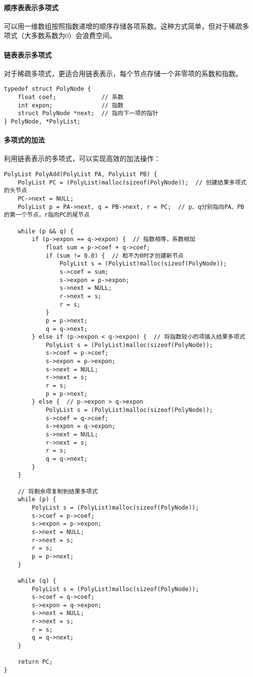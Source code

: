 \documentclass{../../note}
\begin{document}
\paragraph{顺序表表示多项式}
可以用一维数组按照指数递增的顺序存储各项系数。这种方式简单，但对于稀疏多项式（大多数系数为0）会浪费空间。

\paragraph{链表表示多项式}
对于稀疏多项式，更适合用链表表示，每个节点存储一个非零项的系数和指数。

\begin{verbatim}
typedef struct PolyNode {
    float coef;             // 系数
    int expon;              // 指数
    struct PolyNode *next;  // 指向下一项的指针
} PolyNode, *PolyList;
\end{verbatim}

\paragraph{多项式的加法}
利用链表表示的多项式，可以实现高效的加法操作：

\begin{verbatim}
PolyList PolyAdd(PolyList PA, PolyList PB) {
    PolyList PC = (PolyList)malloc(sizeof(PolyNode));  // 创建结果多项式的头节点
    PC->next = NULL;
    PolyList p = PA->next, q = PB->next, r = PC;  // p、q分别指向PA、PB的第一个节点，r指向PC的尾节点

    while (p && q) {
        if (p->expon == q->expon) {  // 指数相等，系数相加
            float sum = p->coef + q->coef;
            if (sum != 0.0) {  // 和不为0时才创建新节点
                PolyList s = (PolyList)malloc(sizeof(PolyNode));
                s->coef = sum;
                s->expon = p->expon;
                s->next = NULL;
                r->next = s;
                r = s;
            }
            p = p->next;
            q = q->next;
        } else if (p->expon < q->expon) {  // 将指数较小的项插入结果多项式
            PolyList s = (PolyList)malloc(sizeof(PolyNode));
            s->coef = p->coef;
            s->expon = p->expon;
            s->next = NULL;
            r->next = s;
            r = s;
            p = p->next;
        } else {  // p->expon > q->expon
            PolyList s = (PolyList)malloc(sizeof(PolyNode));
            s->coef = q->coef;
            s->expon = q->expon;
            s->next = NULL;
            r->next = s;
            r = s;
            q = q->next;
        }
    }

    // 将剩余项复制到结果多项式
    while (p) {
        PolyList s = (PolyList)malloc(sizeof(PolyNode));
        s->coef = p->coef;
        s->expon = p->expon;
        s->next = NULL;
        r->next = s;
        r = s;
        p = p->next;
    }

    while (q) {
        PolyList s = (PolyList)malloc(sizeof(PolyNode));
        s->coef = q->coef;
        s->expon = q->expon;
        s->next = NULL;
        r->next = s;
        r = s;
        q = q->next;
    }

    return PC;
}
\end{verbatim}
\end{document}
